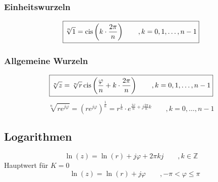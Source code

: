 \subsubsection{Einheitswurzeln}
\[ \boxed{\sqrt[n]{1} = \operatorname{cis}\left(k \cdot \frac{2 \pi}{n}\right) 
\qquad , k = 0, 1, \ldots, n-1} \]

\subsubsection{Allgemeine Wurzeln}
\[ \boxed{\sqrt[n]{z} 
= \sqrt[n]{r}\operatorname{cis}\left(\frac{\varphi}{n} + k \cdot \frac{2 \pi}{n}\right) 
\qquad , k = 0, 1, \ldots, n-1} \]
\[ \boxed{\sqrt[n]{r e^{j \varphi}} 
= \left( r e^{j \varphi} \right)^{\frac{1}{n}} 
= r^{\frac{1}{n}} \cdot e^{\frac{j \varphi}{n} + j \frac{2 \pi}{n}k} 
\qquad , k = 0,\ldots, n - 1} \]

\subsection{Logarithmen}
\[ \boxed{\ln(z) = \ln(r) + j \varphi + 2 \pi k j \qquad , k \in \mathbb{Z}} \]
Hauptwert für $K = 0$
\[ \boxed{\quad \ln(z) = \ln(r) + j \varphi 
\qquad , -\pi < \varphi \leq \pi} \]
